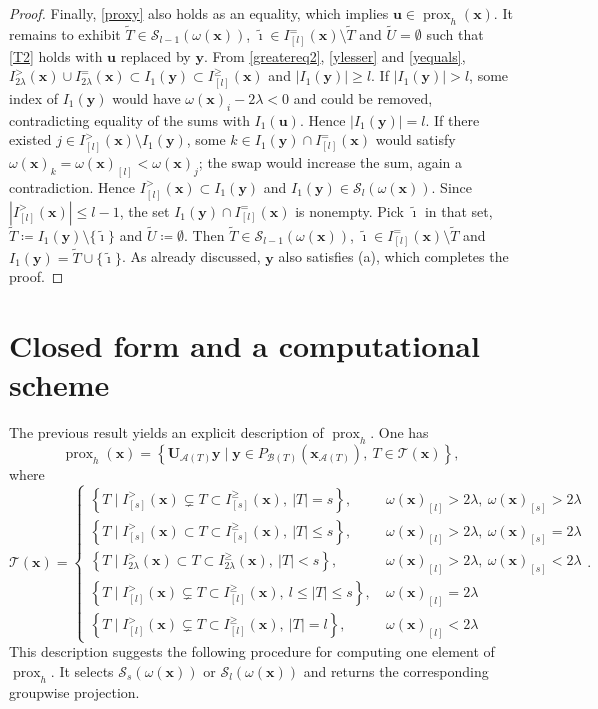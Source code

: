 \documentclass[11pt,a4paper]{article}
\theoremstyle{plain}
\theoremstyle{definition}
\theoremstyle{remark}
\newcommand*\x{\mathbf{x}}
\newcommand*\U{\mathbf{u}}
\newcommand*\y{\mathbf{y}}
\newcommand*\prox{\operatorname{prox}}
\begin{document}
\begin{proof}
  Finally, \eqref{proxy} also holds as an equality, which implies \(\U \in \prox_h(\x)\).
  It remains to exhibit \(\tilde{T}\in\mathcal{S}_{l-1}(\omega(\x))\), \(\tilde{\imath}\in I^=_{[l]}(\x)\setminus\tilde{T}\) and \(\tilde{U}=\emptyset\) such that \eqref{T2} holds with \(\U\) replaced by \(\y\).
  From \eqref{greatereq2}, \eqref{ylesser} and \eqref{yequals}, \(I_{2\lambda}^>(\x)\cup I_{2\lambda}^=(\x)\subset I_1(\y)\subset I_{[l]}^\geq(\x)\) and \(|I_1(\y)|\geq l\).
  If \(|I_1(\y)|>l\), some index of \(I_1(\y)\) would have \(\omega(\x)_i-2\lambda<0\) and could be removed, contradicting equality of the sums with \(I_1(\U)\).
  Hence \(|I_1(\y)|=l\).
  If there existed \(j\in I_{[l]}^>(\x)\setminus I_1(\y)\), some \(k\in I_1(\y)\cap I^=_{[l]}(\x)\) would satisfy \(\omega(\x)_k=\omega(\x)_{[l]}<\omega(\x)_j\); the swap would increase the sum, again a contradiction.
  Hence \(I_{[l]}^>(\x)\subset I_1(\y)\) and \(I_1(\y)\in\mathcal{S}_l(\omega(\x))\).
  Since \(|I_{[l]}^>(\x)|\leq l-1\), the set \(I_1(\y)\cap I^=_{[l]}(\x)\) is nonempty.
  Pick \(\tilde{\imath}\) in that set, \(\tilde{T}\coloneqq I_1(\y)\setminus\{\tilde{\imath}\}\) and \(\tilde{U}\coloneqq\emptyset\).
  Then \(\tilde{T}\in\mathcal{S}_{l-1}(\omega(\x))\), \(\tilde{\imath}\in I^=_{[l]}(\x)\setminus\tilde{T}\) and \(I_1(\y)=\tilde{T}\cup\{\tilde{\imath}\}\).
  As already discussed, \(\y\) also satisfies (a), which completes the proof.
\end{proof}

\section{Closed form and a computational scheme}
\label{sec:closed}

The previous result yields an explicit description of \(\prox_h\).
One has
$$
  \prox_h(\x)=\left\{\mathbf{U}_{\mathcal{A}(T)} \y\mid \y \in P_{\mathcal{B}(T)}\left(\x_{\mathcal{A}(T)}\right),\ T\in\mathcal{T}(\x)\right\},
$$
where
$$
  \mathcal{T}(\x)=
  \begin{cases}\left\{T\mid I_{[s]}^>({\x}) \subsetneq T \subset I_{[s]}^\geq({\x}),\ |T|=s\right\},          & \ \omega(\x)_{[l]}>2 \lambda,\ \omega(\x)_{[s]}>2 \lambda \\
             \left\{T\mid I_{[s]}^>({\x}) \subset T \subset I_{[s]}^\geq({\x}),\ |T| \leq s\right\},        & \ \omega(\x)_{[l]}>2 \lambda,\ \omega(\x)_{[s]}=2 \lambda \\
             \left\{T\mid I_{2\lambda}^>({\x}) \subset T \subset I_{2\lambda}^\geq({\x}),\ |T| < s\right\}, & \ \omega(\x)_{[l]}>2 \lambda,\ \omega(\x)_{[s]}<2 \lambda
             \\\left\{T\mid I_{[l]}^>({\x}) \subsetneq T \subset I_{[l]}^\geq({\x}),\ l\leq|T| \leq s\right\}, &\ \omega(\x)_{[l]}=2 \lambda  \\
             \left\{T\mid I_{[l]}^>({\x}) \subsetneq T \subset I_{[l]}^\geq({\x}),\ |T|=l\right\},          & \ \omega(\x)_{[l]}<2 \lambda
  \end{cases}.
$$
This description suggests the following procedure for computing one element of
\(\prox_h\).
It selects \(\mathcal{S}_{s}(\omega(\x))\) or \(\mathcal{S}_l(\omega(\x))\) and returns the corresponding groupwise projection.
\end{document}
